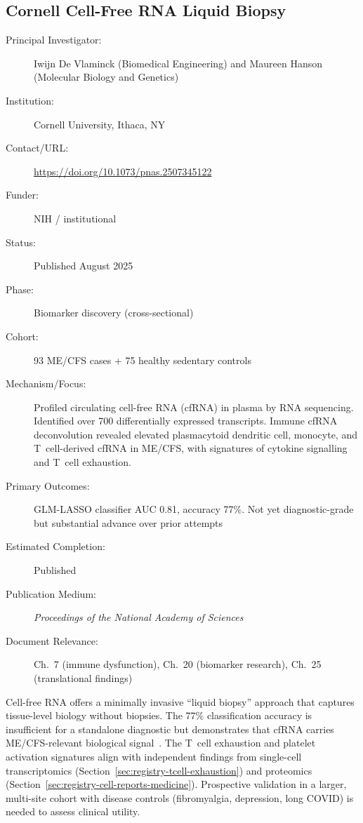 \subsection{Cornell Cell-Free RNA Liquid Biopsy}
\label{sec:registry-cfrna}

\begin{description}
    \item[Principal Investigator:] Iwijn De Vlaminck (Biomedical Engineering)
        and Maureen Hanson (Molecular Biology and Genetics)
    \item[Institution:] Cornell University, Ithaca, NY
    \item[Contact/URL:] \url{https://doi.org/10.1073/pnas.2507345122}
    \item[Funder:] NIH / institutional
    \item[Status:] Published August 2025
    \item[Phase:] Biomarker discovery (cross-sectional)
    \item[Cohort:] 93 ME/CFS cases + 75 healthy sedentary controls
    \item[Mechanism/Focus:] Profiled circulating cell-free RNA (cfRNA) in
        plasma by RNA sequencing.  Identified over 700 differentially expressed
        transcripts.  Immune cfRNA deconvolution revealed elevated
        plasmacytoid dendritic cell, monocyte, and T~cell-derived cfRNA in
        ME/CFS, with signatures of cytokine signalling and T~cell exhaustion.
    \item[Primary Outcomes:] GLM-LASSO classifier AUC 0.81, accuracy 77\%.
        Not yet diagnostic-grade but substantial advance over prior attempts
    \item[Estimated Completion:] Published
    \item[Publication Medium:] \textit{Proceedings of the National Academy of
        Sciences}
    \item[Document Relevance:] Ch.~7 (immune dysfunction), Ch.~20 (biomarker
        research), Ch.~25 (translational findings)
\end{description}

Cell-free RNA offers a minimally invasive ``liquid biopsy'' approach that
captures tissue-level biology without biopsies.  The 77\% classification
accuracy is insufficient for a standalone diagnostic but demonstrates that
cfRNA carries ME/CFS-relevant biological signal~\cite{Gardella2025cfRNA}.
The T~cell exhaustion and platelet activation signatures align with
independent findings from single-cell transcriptomics
(Section~\ref{sec:registry-tcell-exhaustion}) and proteomics
(Section~\ref{sec:registry-cell-reports-medicine}).  Prospective validation
in a larger, multi-site cohort with disease controls (fibromyalgia,
depression, long COVID) is needed to assess clinical utility.

